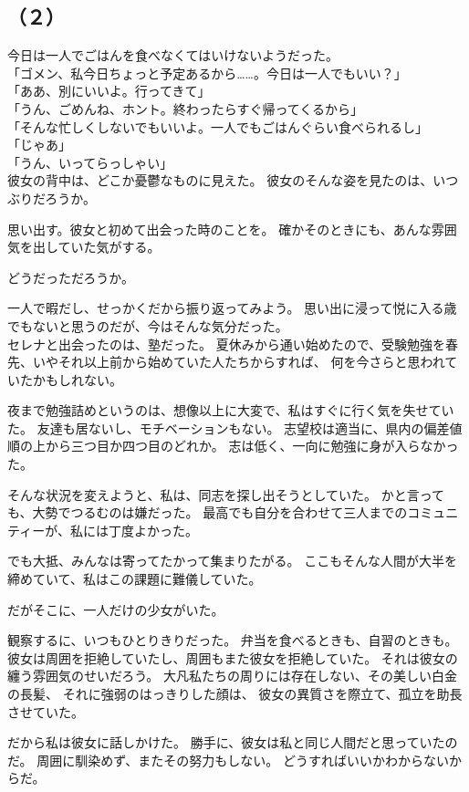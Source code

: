 \documentclass[../IHMain]{subfiles}
\begin{document}
\subsection{（２）}
今日は一人でごはんを食べなくてはいけないようだった。\\
「ゴメン、私今日ちょっと予定あるから……。今日は一人でもいい？」\\
「ああ、別にいいよ。行ってきて」\\
「うん、ごめんね、ホント。終わったらすぐ帰ってくるから」\\
「そんな忙しくしないでもいいよ。一人でもごはんぐらい食べられるし」\\
「じゃあ」\\
「うん、いってらっしゃい」\\
彼女の背中は、どこか憂鬱なものに見えた。
彼女のそんな姿を見たのは、いつぶりだろうか。

思い出す。彼女と初めて出会った時のことを。
確かそのときにも、あんな雰囲気を出していた気がする。

どうだっただろうか。

一人で暇だし、せっかくだから振り返ってみよう。
思い出に浸って悦に入る歳でもないと思うのだが、今はそんな気分だった。\\

セレナと出会ったのは、塾だった。
夏休みから通い始めたので、受験勉強を春先、いやそれ以上前から始めていた人たちからすれば、
何を今さらと思われていたかもしれない。

夜まで勉強詰めというのは、想像以上に大変で、私はすぐに行く気を失せていた。
友達も居ないし、モチベーションもない。
志望校は適当に、県内の偏差値順の上から三つ目か四つ目のどれか。
志は低く、一向に勉強に身が入らなかった。

そんな状況を変えようと、私は、同志を探し出そうとしていた。
かと言っても、大勢でつるむのは嫌だった。
最高でも自分を合わせて三人までのコミュニティーが、私には丁度よかった。

でも大抵、みんなは寄ってたかって集まりたがる。
ここもそんな人間が大半を締めていて、私はこの課題に難儀していた。

だがそこに、一人だけの少女がいた。

観察するに、いつもひとりきりだった。
弁当を食べるときも、自習のときも。
彼女は周囲を拒絶していたし、周囲もまた彼女を拒絶していた。
それは彼女の纏う雰囲気のせいだろう。
大凡私たちの周りには存在しない、その美しい白金の長髪、
それに強弱のはっきりした顔は、
彼女の異質さを際立て、孤立を助長させていた。

だから私は彼女に話しかけた。
勝手に、彼女は私と同じ人間だと思っていたのだ。
周囲に馴染めず、またその努力もしない。
どうすればいいかわからないからだ。
\end{document}
